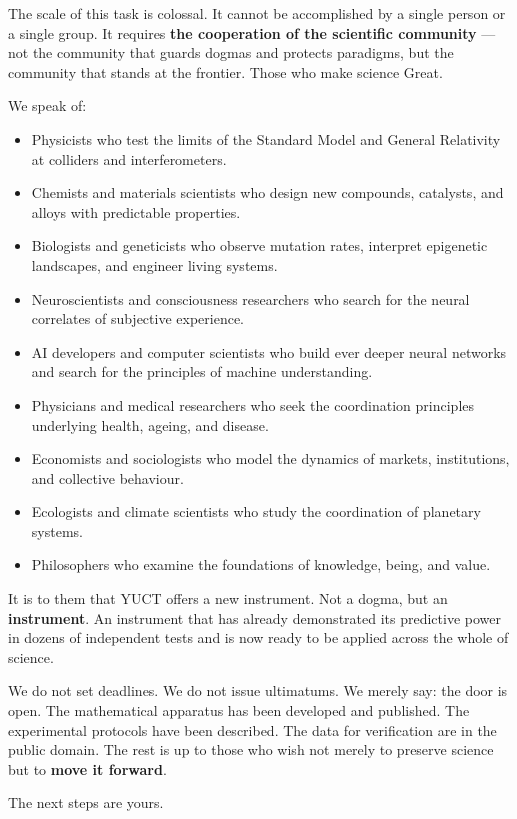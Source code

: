 \documentclass[12pt,a4paper]{article}
\begin{document}
	The scale of this task is colossal. It cannot be accomplished by a single person or a single group. It requires \textbf{the cooperation of the scientific community} — not the community that guards dogmas and protects paradigms, but the community that stands at the frontier. Those who make science Great.
	
	We speak of:
	\begin{itemize}
		\item Physicists who test the limits of the Standard Model and General Relativity at colliders and interferometers.
		\item Chemists and materials scientists who design new compounds, catalysts, and alloys with predictable properties.
		\item Biologists and geneticists who observe mutation rates, interpret epigenetic landscapes, and engineer living systems.
		\item Neuroscientists and consciousness researchers who search for the neural correlates of subjective experience.
		\item AI developers and computer scientists who build ever deeper neural networks and search for the principles of machine understanding.
		\item Physicians and medical researchers who seek the coordination principles underlying health, ageing, and disease.
		\item Economists and sociologists who model the dynamics of markets, institutions, and collective behaviour.
		\item Ecologists and climate scientists who study the coordination of planetary systems.
		\item Philosophers who examine the foundations of knowledge, being, and value.
	\end{itemize}
	
	It is to them that YUCT offers a new instrument. Not a dogma, but an \textbf{instrument}. An instrument that has already demonstrated its predictive power in dozens of independent tests and is now ready to be applied across the whole of science.
	
	We do not set deadlines. We do not issue ultimatums. We merely say: the door is open. The mathematical apparatus has been developed and published. The experimental protocols have been described. The data for verification are in the public domain. The rest is up to those who wish not merely to preserve science but to \textbf{move it forward}.
	
	The next steps are yours.
	
\end{document}
